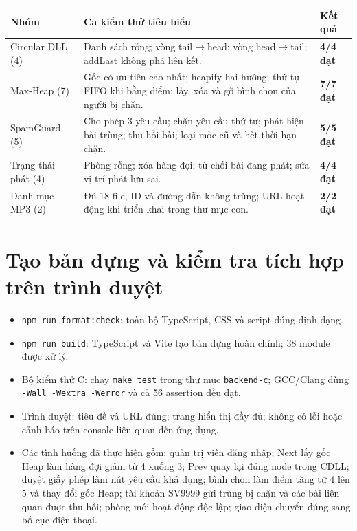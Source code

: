 \documentclass[12pt,a4paper,twoside,openright]{report}
\newcommand{\code}[1]{\texttt{#1}}
\newcommand{\status}[1]{\textcolor{hbgreen}{\sffamily\bfseries #1}}
\begin{document}
\begin{table}[h]\centering\small
\begin{tabularx}{\textwidth}{@{}p{2.7cm}Xp{2.4cm}@{}}
\toprule
\textbf{Nhóm} & \textbf{Ca kiểm thử tiêu biểu} & \textbf{Kết quả}\\
\midrule
Circular DLL (4) & Danh sách rỗng; vòng tail$\to$head; vòng head$\to$tail; addLast không phá liên kết. &
\status{4/4 đạt}\\
Max-Heap (7) & Gốc có ưu tiên cao nhất; heapify hai hướng; thứ tự FIFO khi bằng điểm; lấy,
xóa và gỡ bình chọn của người bị chặn. &
\status{7/7 đạt}\\
SpamGuard (5) & Cho phép 3 yêu cầu; chặn yêu cầu thứ tư; phát hiện bài trùng; thu hồi bài;
loại mốc cũ và hết thời hạn chặn. &
\status{5/5 đạt}\\
Trạng thái phát (4) & Phòng rỗng; xóa hàng đợi; từ chối bài đang phát; sửa vị trí phát lưu sai. &
\status{4/4 đạt}\\
Danh mục MP3 (2) & Đủ 18 file, ID và đường dẫn không trùng; URL hoạt động khi triển khai
trong thư mục con. &
\status{2/2 đạt}\\
\bottomrule
\end{tabularx}
\end{table}

\section{Tạo bản dựng và kiểm tra tích hợp trên trình duyệt}
\begin{itemize}
  \item \code{npm run format:check}: toàn bộ TypeScript, CSS và script đúng định dạng.
  \item \code{npm run build}: TypeScript và Vite tạo bản dựng hoàn chỉnh; 38 module được xử lý.
  \item Bộ kiểm thử C: chạy \code{make test} trong thư mục \code{backend-c};
  GCC/Clang dùng \code{-Wall -Wextra -Werror} và cả 56 assertion đều đạt.
  \item Trình duyệt: tiêu đề và URL đúng; trang hiển thị đầy đủ; không có lỗi hoặc cảnh báo
  trên console liên quan đến ứng dụng.
  \item Các tình huống đã thực hiện gồm: quản trị viên đăng nhập; Next lấy gốc Heap làm hàng
  đợi giảm từ 4 xuống 3; Prev quay lại đúng node trong CDLL; duyệt giấy phép làm nút yêu cầu
  khả dụng; bình chọn làm điểm tăng từ 4 lên 5 và thay đổi gốc Heap; tài khoản SV9999 gửi
  trùng bị chặn và các bài liên quan được thu hồi; phòng mới hoạt động độc lập; giao diện
  chuyển đúng sang bố cục điện thoại.
\end{itemize}
\end{document}
